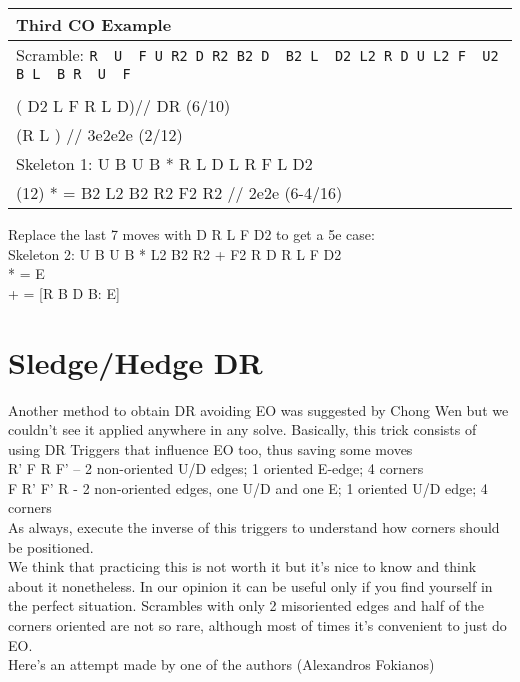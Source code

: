 \documentclass[11pt,a4paper]{book}
\newcommand{\p}{\textquotesingle}
\newcommand{\m}{\texttt}
\newcommand{\ps}{\p\,\,}
\newcommand{\comment}[1]{{\color{gray}\quad//#1}}
\begin{document}
\bigskip
\begin{tabular}{|l|}
\hline
\textbf{Third CO Example }\\
\hline
Scramble: \m{R\ps U\ps F U R2 D R2 B2 D\ps B2 L\ps D2 L2 R D U L2 F\ps U2 B L\ps B R\ps U\ps F}\\
\hline
\begin{minipage}[l]{0.650\textwidth}
\bigskip
\m{U\ps B\ps U B \comment{ CO, corners 2 moves from solved (4/4)}\\
( D2 L F\ps R\ps L D)\comment{ DR (6/10) }\\
(R L\ps) \comment{ 3e2e2e (2/12) }\\
Skeleton 1: U\ps B\ps U B * R\ps L D\ps L\ps R F L\ps D2 \\ (12)
* = B2 L2 B2 R2 F2 R2 \comment{ 2e2e (6-4/16)}}
\bigskip
\end{minipage}
\begin{minipage}[c]{0.25\textwidth}
\centering
\def\svgwidth{\columnwidth}

\end{minipage}\\
\hline
\end{tabular}
\bigskip
\newline
Replace the last 7 moves with D\ps R L\ps F D2 to get a 5e case:\\
\newline
Skeleton 2: U\ps B\ps U B\ps * L2 B2 R2 + F2 R D\ps R L\ps F D2 \\
* = E\ps \\
+ = [R\ps B\ps D\ps B: E]\\


\section{Sledge/Hedge DR}

Another method to obtain DR avoiding EO was suggested by Chong Wen but we couldn’t see it applied anywhere in any solve. Basically, this trick consists of using DR Triggers that influence EO too, thus saving some moves\\
\newline
R’ F R F’ – 2 non-oriented U/D edges; 1 oriented E-edge; 4 corners\\
F R’ F’ R - 2 non-oriented edges, one U/D and one E; 1 oriented U/D edge; 4 corners\\
\newline
As always, execute the inverse of this triggers to understand how corners should be positioned.\\
We think that practicing this is not worth it but it’s nice to know and think about it nonetheless. In our opinion it can be useful only if you find yourself in the perfect situation. Scrambles with only 2 misoriented edges and half of the corners oriented are not so rare, although most of times it’s convenient to just do EO.\\
\newline
Here’s an attempt made by one of the authors (Alexandros Fokianos)\\
\end{document}
